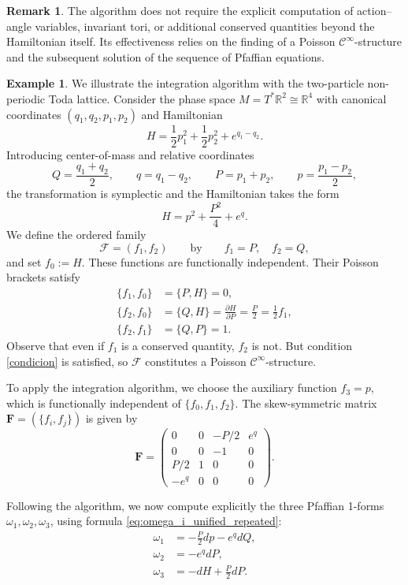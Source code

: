 \documentclass{article}
\theoremstyle{remark}
\theoremstyle{definition}
\newtheorem{remark}{Remark}[section]
\newtheorem{example}{Example}[section]
\newcommand{\cinf}{$\mathcal{C}^{\infty}$}
\begin{document}
\begin{remark}
The algorithm does not require the explicit computation of action--angle
variables, invariant tori, or additional conserved quantities beyond the
Hamiltonian itself. Its effectiveness relies on the finding of a
Poisson \cinf-structure and the subsequent solution of the sequence of Pfaffian equations.
\end{remark}


\begin{example}
\sloppy
We illustrate the integration algorithm with the two-particle non-periodic Toda lattice. Consider the phase space $M = T^*\mathbb{R}^2 \cong \mathbb{R}^4$ with canonical coordinates 
$(q_1,q_2,p_1,p_2)$ and Hamiltonian
\[
H=\frac12 p_1^2+\frac12 p_2^2+e^{q_1-q_2}.
\]
Introducing center-of-mass and relative coordinates
\[
Q=\frac{q_1+q_2}{2}, \qquad q=q_1-q_2, \qquad P=p_1+p_2, \qquad p=\frac{p_1-p_2}{2},
\]
the transformation is symplectic and the Hamiltonian takes the form
\[
H=p^2+\frac{P^2}{4}+e^{q}.
\]
We define the ordered family
\[
\mathcal{F}=(f_1,f_2) \qquad\text{by}\qquad f_1=P,\quad f_2=Q,
\]
and set $f_0:=H$. These functions are functionally independent. Their Poisson brackets satisfy
\begin{align*}
\{f_1,f_0\} &= \{P, H\} = 0, \\
\{f_2,f_0\} &= \{Q, H\} = \frac{\partial H}{\partial P} = \frac{P}{2} = \frac{1}{2}f_1, \\
\{f_2,f_1\} &= \{Q, P\} = 1.
\end{align*}
Observe that even if $f_1$ is a conserved quantity, $f_2$ is not. But condition \eqref{condicion} is satisfied, so $\mathcal{F}$ constitutes a Poisson \cinf-structure.


To apply the integration algorithm, we choose the auxiliary function $f_3=p$, which is functionally independent of $\{f_0,f_1,f_2\}$. The skew-symmetric matrix $\mathbf{F}=(\{f_i,f_j\})$ is given by
\[
\mathbf{F} = 
\begin{pmatrix}
0 & 0 & -P/2 & e^q \\
0 & 0 & -1 & 0 \\
P/2 & 1 & 0 & 0 \\
-e^q & 0 & 0 & 0
\end{pmatrix}.
\]

\sloppy
Following the algorithm, we now compute explicitly the three Pfaffian 1-forms $\omega_1, \omega_2, \omega_3$, using formula \eqref{eq:omega_i_unified_repeated}:
\begin{align*}
\omega_1 &= -\frac{P}{2} dp - e^q dQ, \\
\omega_2 &= -e^q dP, \\
\omega_3 &= -dH +\frac{P}{2} dP.
\end{align*}


\end{example}
\end{document}
